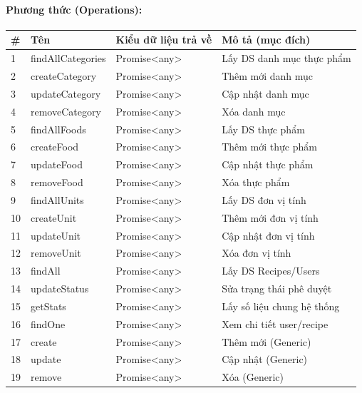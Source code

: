 \documentclass[12pt,a4paper]{article}
\begin{document}
\paragraph{Phương thức (Operations):}
\begin{longtable}{|p{0.6cm}|p{3.8cm}|p{2.6cm}|p{6.5cm}|}
\hline
\textbf{\#} & \textbf{Tên} & \textbf{Kiểu dữ liệu trả về} & \textbf{Mô tả (mục đích)} \\ \hline
\endhead
1 & findAllCategories & Promise\textless{}any\textgreater{} & Lấy DS danh mục thực phẩm \\ \hline
2 & createCategory & Promise\textless{}any\textgreater{} & Thêm mới danh mục \\ \hline
3 & updateCategory & Promise\textless{}any\textgreater{} & Cập nhật danh mục \\ \hline
4 & removeCategory & Promise\textless{}any\textgreater{} & Xóa danh mục \\ \hline
5 & findAllFoods & Promise\textless{}any\textgreater{} & Lấy DS thực phẩm \\ \hline
6 & createFood & Promise\textless{}any\textgreater{} & Thêm mới thực phẩm \\ \hline
7 & updateFood & Promise\textless{}any\textgreater{} & Cập nhật thực phẩm \\ \hline
8 & removeFood & Promise\textless{}any\textgreater{} & Xóa thực phẩm \\ \hline
9 & findAllUnits & Promise\textless{}any\textgreater{} & Lấy DS đơn vị tính \\ \hline
10 & createUnit & Promise\textless{}any\textgreater{} & Thêm mới đơn vị tính \\ \hline
11 & updateUnit & Promise\textless{}any\textgreater{} & Cập nhật đơn vị tính \\ \hline
12 & removeUnit & Promise\textless{}any\textgreater{} & Xóa đơn vị tính \\ \hline
13 & findAll & Promise\textless{}any\textgreater{} & Lấy DS Recipes/Users \\ \hline
14 & updateStatus & Promise\textless{}any\textgreater{} & Sửa trạng thái phê duyệt \\ \hline
15 & getStats & Promise\textless{}any\textgreater{} & Lấy số liệu chung hệ thống \\ \hline
16 & findOne & Promise\textless{}any\textgreater{} & Xem chi tiết user/recipe \\ \hline
17 & create & Promise\textless{}any\textgreater{} & Thêm mới (Generic) \\ \hline
18 & update & Promise\textless{}any\textgreater{} & Cập nhật (Generic) \\ \hline
19 & remove & Promise\textless{}any\textgreater{} & Xóa (Generic) \\ \hline
\end{longtable}
\end{document}
